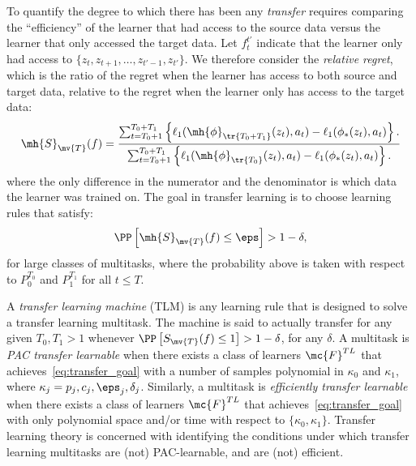 \documentclass{article}
\begin{document}
To quantify the degree to which there has been any \emph{transfer} requires comparing the ``efficiency'' of the learner that had access to the source data versus the learner that only accessed the target data. Let $f_t^{t'}$ indicate that the learner only had access to $\{z_t, z_{t+1}, \ldots, z_{t'-1}, z_{t'}\}$.
We therefore consider the \emph{relative regret}, which is the ratio of the regret when the learner has access to both source and target data, relative to the regret when the learner only has access to the target data:
\begin{align}
    \mh{S}_{\mv{T}}(f) = 
    \frac{
        \sum_{t=T_0+1}^{T_0+T_1} \left\{ 
    \ell_1(\mh{\phi}_{\tr{T_0+T_1}}(z_t), a_t)    -  
    \ell_1(\phi_*(z_t), a_t)  
    \right\}. 
}{    \sum_{t=T_0+1}^{T_0+T_1} \left\{ 
    \ell_1(\mh{\phi}_{\tr{T_0}}(z_t), a_t)    -  
    \ell_1(\phi_*(z_t), a_t)  
    \right\}. 
}
 \end{align}
%
where the only difference in the numerator and the denominator is which data the learner was trained on.
The goal in transfer learning  is to choose learning rules that satisfy:
\begin{align} \label{eq:transfer_goal}
    \PP\left[\mh{S}_{\mv{T}}(f)  \leq \eps \right] > 1 - \delta,
\end{align}
for large classes of multitasks, 
where the probability above is taken with respect to $P_0^{T_0}$ and $P_1^{T_1}$ for all $t \leq T$.  

A \emph{transfer learning machine} (TLM) is any learning rule that is designed to solve a transfer learning multitask.  The machine is said to actually transfer for any given $T_0,T_1>1$ whenever $\PP\left[S_{\mv{T}}(f)  \leq 1 \right] > 1 - \delta$, for any $\delta$.  
% 
A multitask is \emph{PAC transfer learnable} when there exists a class of learners $\mc{F}^{TL}$ that achieves~\eqref{eq:transfer_goal} with a number of samples polynomial in $\kappa_0$ and $\kappa_1$, where $\kappa_j=p_j,c_j,\eps_j,\delta_j$.  Similarly, a multitask is \emph{efficiently transfer learnable} when there exists a class of learners $\mc{F}^{TL}$ that achieves~\eqref{eq:transfer_goal} with only polynomial space and/or time with respect to $\{\kappa_0, \kappa_1\}$.
{Transfer learning theory is concerned with identifying the conditions under which transfer learning multitasks are (not) PAC-learnable, and are (not) efficient.}
\end{document}
